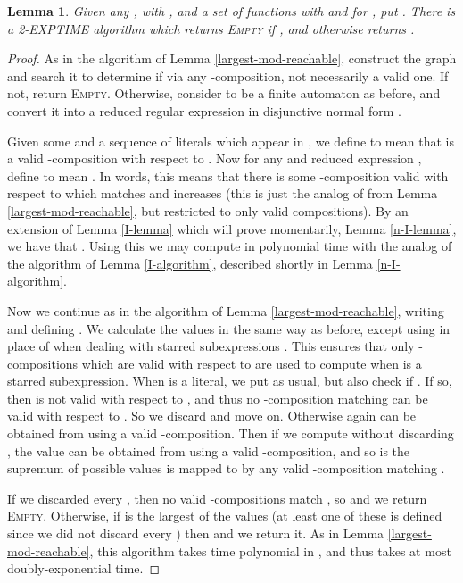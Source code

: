 \documentclass[11pt]{amsart}
\newtheorem{lemma}{Lemma}
\theoremstyle{definition}
\theoremstyle{remark}
\begin{document}
\begin{lemma} \label{n-largest-mod-reachable}
Given any ,  with , and a set  of functions  with  and  for , put . There is a \textsf{2-EXPTIME} algorithm which returns \textsc{Empty} if , and otherwise returns .
\end{lemma}
\begin{proof}
As in the algorithm of Lemma \ref{largest-mod-reachable}, construct the graph  and search it to determine if  via any -composition, not necessarily a valid one. If not, return \textsc{Empty}. Otherwise, consider  to be a finite automaton as before, and convert it into a reduced regular expression  in disjunctive normal form .

Given some  and  a sequence of literals which appear in , we define  to mean that  is a valid -composition with respect to . Now for any  and reduced expression , define  to mean . In words, this means that there is some -composition valid with respect to  which matches  and increases  (this is just the analog of  from Lemma \ref{largest-mod-reachable}, but restricted to only valid compositions). By an extension of Lemma \ref{I-lemma} which will prove momentarily, Lemma \ref{n-I-lemma}, we have that . Using this we may compute  in polynomial time with the analog of the algorithm of Lemma \ref{I-algorithm}, described shortly in Lemma \ref{n-I-algorithm}.

Now we continue as in the algorithm of Lemma \ref{largest-mod-reachable}, writing  and defining . We calculate the values  in the same way as before, except using  in place of  when dealing with starred subexpressions . This ensures that only -compositions which are valid with respect to  are used to compute  when  is a starred subexpression. When  is a literal, we put  as usual, but also check if . If so, then  is not valid with respect to , and thus no -composition matching  can be valid with respect to . So we discard  and move on. Otherwise again  can be obtained from  using a valid -composition. Then if we compute  without discarding , the value  can be obtained from  using a valid -composition, and so  is the supremum of possible values  is mapped to by any valid -composition matching .

If we discarded every , then no valid -compositions match , so  and we return \textsc{Empty}. Otherwise, if  is the largest of the values  (at least one of these is defined since we did not discard every ) then  and we return it. As in Lemma \ref{largest-mod-reachable}, this algorithm takes time polynomial in , and thus takes at most doubly-exponential time.
\end{proof}
\end{document}
